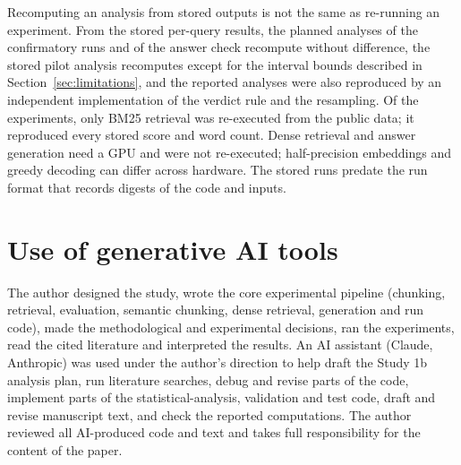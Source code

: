 \documentclass[11pt]{article}
\begin{document}
Recomputing an analysis from stored outputs is not the same as re-running an experiment. From the stored per-query results, the planned analyses of the confirmatory runs and of the answer check recompute without difference, the stored pilot analysis recomputes except for the \PilotBounds{} interval bounds described in Section~\ref{sec:limitations}, and the reported analyses were also reproduced by an independent implementation of the verdict rule and the resampling. Of the experiments, only BM25 retrieval was re-executed from the public data; it reproduced every stored score and word count. Dense retrieval and answer generation need a GPU and were not re-executed; half-precision embeddings and greedy decoding can differ across hardware. The stored runs predate the run format that records digests of the code and inputs.

\section*{Use of generative AI tools}
The author designed the study, wrote the core experimental pipeline (chunking, retrieval, evaluation, semantic chunking, dense retrieval, generation and run code), made the methodological and experimental decisions, ran the experiments, read the cited literature and interpreted the results. An AI assistant (Claude, Anthropic) was used under the author's direction to help draft the Study 1b analysis plan, run literature searches, debug and revise parts of the code, implement parts of the statistical-analysis, validation and test code, draft and revise manuscript text, and check the reported computations. The author reviewed all AI-produced code and text and takes full responsibility for the content of the paper.

\FloatBarrier



\appendix
\end{document}
